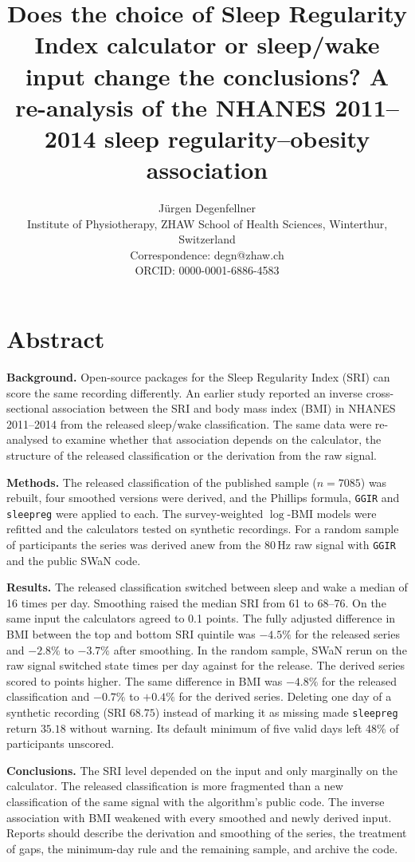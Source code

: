 \documentclass[12pt]{article}
\title{\bfseries Does the choice of Sleep Regularity Index calculator or
sleep/wake input change the conclusions? A re-analysis of the NHANES
2011--2014 sleep regularity--obesity association}
\author{J\"urgen Degenfellner\\[6pt]
\normalsize Institute of Physiotherapy, ZHAW School of Health Sciences,
Winterthur, Switzerland\\
\normalsize Correspondence: degn@zhaw.ch\\
\normalsize ORCID: 0000-0001-6886-4583}
\date{}
\begin{document}
\linenumbers

\maketitle
\thispagestyle{empty}
\clearpage

\section*{Abstract}

\textbf{Background.} Open-source packages for the Sleep Regularity Index
(SRI) can score the same recording differently. An earlier study
reported an inverse cross-sectional association between the SRI and body mass index (BMI) in
NHANES 2011--2014 from the released sleep/wake classification. The same
data were re-analysed to examine whether that association depends on the
calculator, the structure of the released classification or the derivation
from the raw signal.

\noindent\textbf{Methods.} The released classification of the published sample
($n=7085$) was rebuilt, four smoothed versions were derived,
and the Phillips formula, \texttt{GGIR} and \texttt{sleepreg} were applied to
each. The survey-weighted $\log$-BMI models were refitted and the calculators
tested on synthetic recordings.
For a random sample of \rawPrefixR{} participants the series was derived anew
from the 80\,Hz raw signal with \texttt{GGIR} and the public SWaN code.

\noindent\textbf{Results.} The released classification switched
between sleep and wake a median of 16 times per day. Smoothing raised the median SRI from 61 to 68--76. On the same input the calculators agreed to 0.1 points. The fully adjusted difference in BMI between the top and bottom SRI quintile was $-4.5\%$ for the released series and $-2.8\%$ to $-3.7\%$ after smoothing. In the random sample, SWaN rerun on the raw signal switched state \rawSwanTransDay{} times per day against \rawPaxpredmTransDay{} for the release. The derived series scored \rawSwanDiffMean{} to \rawGgirSptDiffMean{} points higher. The same difference in BMI was $-4.8\%$ for the released classification and $-0.7\%$ to $+0.4\%$ for the derived series. Deleting one day of a
synthetic recording (SRI $68.75$) instead of marking it as missing made \texttt{sleepreg} return $35.18$ without warning. Its default minimum of five valid days left 48\% of participants unscored.

\noindent\textbf{Conclusions.} The SRI level depended on the input and only
marginally on the calculator. The released classification is
more fragmented than a new classification of the same signal with the algorithm's public code. The inverse association with BMI weakened with every smoothed and newly derived input. Reports should describe the
derivation and smoothing of the series, the treatment of gaps, the minimum-day rule and the remaining sample, and archive the code.
\end{document}
